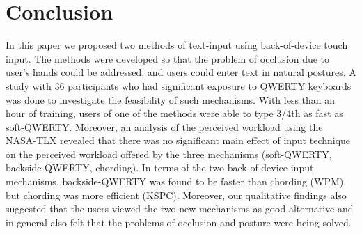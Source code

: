 \section{Conclusion}
In this paper we proposed two methods of text-input using back-of-device touch input. The methods were developed so that the problem of occlusion due to user's hands could be addressed, and users could enter text in natural postures. A study with 36 participants who had significant exposure to QWERTY keyboards was done to investigate the feasibility of such mechanisms. With less than an hour of training, users of one of the methods were able to type 3/4th as fast as soft-QWERTY. Moreover, an analysis of the perceived workload using the NASA-TLX revealed that there was no significant main effect of input technique on the perceived workload offered by the three mechanisms (soft-QWERTY, backside-QWERTY, chording). In terms of the two back-of-device input mechanisms, backside-QWERTY was found to be faster than chording (WPM), but chording was more efficient (KSPC). Moreover, our qualitative findings also suggested that the users viewed the two new mechanisms as good alternative and in general also felt that the problems of occlusion and posture were being solved. 